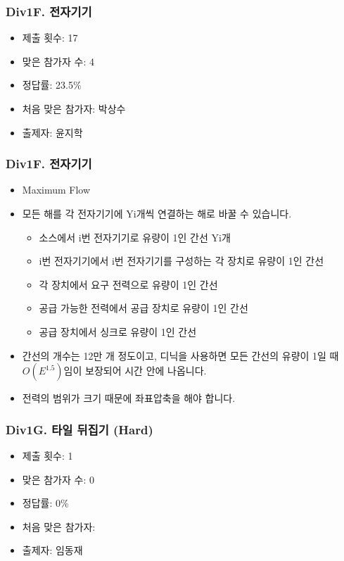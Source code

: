 \documentclass[xetex]{beamer}
\begin{document}
\begin{frame}
  \frametitle{Div1F. 전자기기}
  \begin{itemize}
    \item 제출 횟수: 17
    \item 맞은 참가자 수: 4
    \item 정답률: 23.5\%
    \item 처음 맞은 참가자: 박상수
    \item 출제자: 윤지학
  \end{itemize}
\end{frame}

\begin{frame}
  \frametitle{Div1F. 전자기기}
  \begin{itemize}
    \item Maximum Flow
    \item 모든 해를 각 전자기기에 Yi개씩 연결하는 해로 바꿀 수 있습니다.
    \begin{itemize}
      \item 소스에서 i번 전자기기로 유량이 1인 간선 Yi개
      \item i번 전자기기에서 i번 전자기기를 구성하는 각 장치로 유량이 1인 간선
      \item 각 장치에서 요구 전력으로 유량이 1인 간선
      \item 공급 가능한 전력에서 공급 장치로 유량이 1인 간선
      \item 공급 장치에서 싱크로 유량이 1인 간선
    \end{itemize}
    \item 간선의 개수는 12만 개 정도이고, 디닉을 사용하면 모든 간선의 유량이 1일 때 $O(E^{1.5})$임이 보장되어 시간 안에 나옵니다.
    \item 전력의 범위가 크기 때문에 좌표압축을 해야 합니다.
  \end{itemize}
\end{frame}

\begin{frame}
  \frametitle{Div1G. 타일 뒤집기 (Hard)}
  \begin{itemize}
    \item 제출 횟수: 1
    \item 맞은 참가자 수: 0
    \item 정답률: 0\%
    \item 처음 맞은 참가자: 
    \item 출제자: 임동재
  \end{itemize}
\end{frame}
\end{document}
